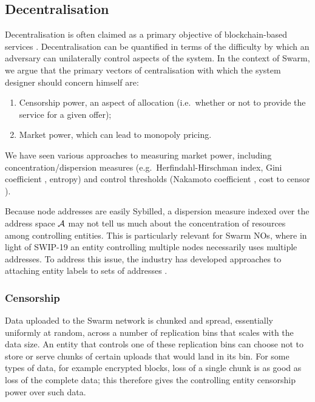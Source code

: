 \subsection{Decentralisation}
\label{section:decentralization}

Decentralisation is often claimed as a primary objective of blockchain-based services \cite{srinivasan2017quantifying}.
%
Decentralisation can be quantified in terms of the difficulty by which an adversary can unilaterally control aspects of the system.
%
In the context of Swarm, we argue that the primary vectors of centralisation with which the system designer should concern himself are:
%
\begin{enumerate}
  \item Censorship power, an aspect of allocation (i.e.~whether or not to provide the service for a given offer);
  \item Market power, which can lead to monopoly pricing.
\end{enumerate}
%
We have seen various approaches to measuring market power, including concentration/dispersion measures (e.g.~Herfindahl-Hirschman index, Gini coefficient \cite{grandjean2024ethereum}, entropy) and control thresholds (Nakamoto coefficient \cite{srinivasan2017quantifying}, cost to censor \cite{fox2023censorship}).

\begin{remark}

  Because node addresses are easily Sybilled, a dispersion measure indexed over the address space $\mathcal{A}$ may not tell us much about the concentration of resources among controlling entities.
  This is particularly relevant for Swarm NOs, where in light of SWIP-19 an entity controlling multiple nodes necessarily uses multiple addresses.
  To address this issue, the industry has developed approaches to attaching entity labels to sets of addresses \cite{victor2020address,arkham2024}.

\end{remark}

\subsubsection{Censorship}

Data uploaded to the Swarm network is chunked and spread, essentially uniformly at random, across a number of replication bins that scales with the data size.
%
An entity that controls one of these replication bins can choose not to store or serve chunks of certain uploads that would land in its bin.
%
For some types of data, for example encrypted blocks, loss of a single chunk is as good as loss of the complete data; this therefore gives the controlling entity censorship power over such data.

